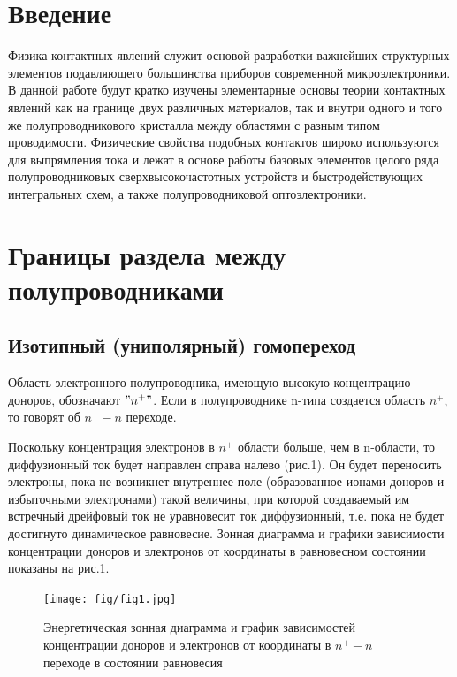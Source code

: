 



\def\labauthors{Есюнин Д.В., Есюнин М.В.}
\def\labgroup{440}
\def\labnumber{1}
\def\labtheme{Измерение статистических характеристик полупроводникового диода}
\renewcommand{\vec}{\mathbf}
\renewcommand{\phi}{\varphi}
\renewcommand{\hat}{\widehat}



\section{Введение}
Физика контактных явлений служит основой разработки важнейших структурных элементов подавляющего большинства приборов современной микроэлектроники. В данной работе будут кратко изучены элементарные основы теории контактных явлений как на границе двух различных материалов, так и внутри одного и того же полупроводникового кристалла между областями с разным типом проводимости. Физические свойства подобных контактов широко используются для выпрямления тока и лежат в основе работы базовых элементов целого ряда полупроводниковых сверхвысокочастотных устройств и быстродействующих интегральных схем, а также полупроводниковой оптоэлектроники.

\section{Границы раздела между полупроводниками}
\subsection{Изотипный (униполярный) гомопереход}
Область электронного полупроводника, имеющую высокую концентрацию доноров, обозначают $"n^+"$. Если в полупроводнике n-типа создается область $n^+$, то говорят об $n^+-n$ переходе. 

Поскольку концентрация электронов в $n^+$ области больше, чем в n-области, то диффузионный ток будет направлен справа налево (рис.1). Он будет переносить электроны, пока не возникнет внутреннее поле (образованное ионами доноров и избыточными электронами) такой величины, при которой создаваемый им встречный дрейфовый ток не уравновесит ток диффузионный, т.е. пока не будет достигнуто динамическое равновесие. Зонная диаграмма и графики зависимости концентрации доноров и электронов от координаты в равновесном состоянии показаны на рис.1. 
\begin{figure}[h!]
	\centering
	\texttt{[image: fig/fig1.jpg]}
	\caption{Энергетическая зонная диаграмма и график зависимостей концентрации доноров и электронов от координаты в $n^+-n$ переходе в состоянии равновесия}
	\label{fig:1}
\end{figure}

